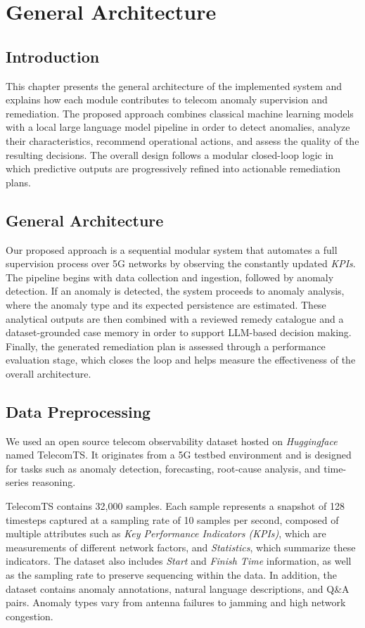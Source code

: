 \chapter{General Architecture}

\section{Introduction}
This chapter presents the general architecture of the implemented system and explains how each module contributes to telecom anomaly supervision and remediation. The proposed approach combines classical machine learning models with a local large language model pipeline in order to detect anomalies, analyze their characteristics, recommend operational actions, and assess the quality of the resulting decisions. The overall design follows a modular closed-loop logic in which predictive outputs are progressively refined into actionable remediation plans.

\section{General Architecture}
Our proposed approach is a sequential modular system that automates a full supervision process over 5G networks by observing the constantly updated \textit{KPIs}. The pipeline begins with data collection and ingestion, followed by anomaly detection. If an anomaly is detected, the system proceeds to anomaly analysis, where the anomaly type and its expected persistence are estimated. These analytical outputs are then combined with a reviewed remedy catalogue and a dataset-grounded case memory in order to support LLM-based decision making. Finally, the generated remediation plan is assessed through a performance evaluation stage, which closes the loop and helps measure the effectiveness of the overall architecture.

\section{Data Preprocessing}

We used an open source telecom observability dataset hosted on \textit{Huggingface} named TelecomTS\cite{telecomts2025}. It originates from a 5G testbed environment and is designed for tasks such as anomaly detection, forecasting, root-cause analysis, and time-series reasoning.

TelecomTS contains 32,000 samples. Each sample represents a snapshot of 128 timesteps captured at a sampling rate of 10 samples per second, composed of multiple attributes such as \textit{Key Performance Indicators (KPIs)}, which are measurements of different network factors, and \textit{Statistics}, which summarize these indicators. The dataset also includes \textit{Start} and \textit{Finish Time} information, as well as the sampling rate to preserve sequencing within the data. In addition, the dataset contains anomaly annotations, natural language descriptions, and Q\&A pairs. Anomaly types vary from antenna failures to jamming and high network congestion.

